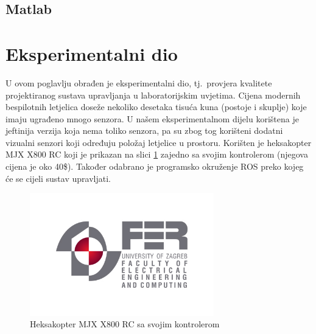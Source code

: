 \documentclass[times, utf8, diplomski]{fer}
\begin{document}
\subsection{Matlab}

\section{Eksperimentalni dio}
U ovom poglavlju obrađen je eksperimentalni dio, tj.~provjera kvalitete projektiranog sustava upravljanja u laboratorijskim uvjetima. 
Cijena modernih bespilotnih letjelica doseže nekoliko desetaka tisuća kuna (postoje i skuplje) koje imaju ugrađeno mnogo senzora. U našem eksperimentalnom dijelu korištena je jeftinija verzija koja nema toliko senzora, pa su zbog tog korišteni dodatni vizualni senzori koji određuju položaj letjelice u prostoru. Korišten je heksakopter MJX X800 RC koji je prikazan na slici \ref{fig:MJX X800 RC} zajedno sa svojim kontrolerom (njegova cijena je oko 40\$). Također odabrano je programsko okruženje ROS preko kojeg će se cijeli sustav upravljati. 
\begin{figure}[htb]
\centering
\includegraphics[width=8cm]{img/fer_logo.jpg}
\caption{Heksakopter MJX X800 RC sa svojim kontrolerom}
\label{fig:MJX X800 RC}
\end{figure}\\
\end{document}
